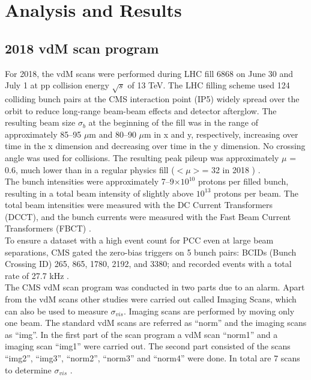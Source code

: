 \chapter{Analysis and Results}


\section{2018 vdM scan program}

For 2018, the vdM scans were performed during LHC fill 6868 on June 30 and July 1 at pp collision energy $\sqrt{s}$ of 13 TeV. The LHC filling scheme used  124 colliding bunch pairs at the CMS interaction point (IP5) widely spread over the orbit to reduce long-range beam-beam effects and detector afterglow.  The resulting beam size $\sigma_{b}$ at the beginning of the fill was in the range of approximately 85–95 $\mu$m and 80–90 $\mu$m in x and y, respectively, increasing over time in the x dimension and decreasing over time in the y dimension. No crossing angle was used for collisions. The resulting peak pileup was approximately $\mu$ = 0.6, much lower than in a regular physics fill ($<\mu>$= 32 in 2018 ) \cite{pas_18}.\\ %
The bunch intensities were approximately 7–9$\times 10^{10}$ protons per filled bunch, resulting in a total beam intensity of slightly above $10^{13}$ protons per beam. The total beam intensities were measured with the DC Current Transformers (DCCT), and the bunch currents were measured with the Fast Beam Current Transformers (FBCT) \cite{pas_18}.\\
To ensure a dataset with a high event count for PCC even at large beam separations, CMS gated the zero-bias triggers on 5 bunch pairs: BCIDs (Bunch Crossing ID) 265, 865, 1780, 2192, and 3380; and recorded events with a total rate of 27.7 kHz \cite{pas_18}.\\
The CMS vdM scan program was conducted in two parts due to an alarm. Apart from the vdM scans other studies were carried out called Imaging Scans, which can also be used to measure $\sigma_{vis}$. Imaging scans are performed by moving only one beam. The standard vdM scans are referred as ``norm'' and the imaging scans as ``img''. In the first part of the scan program a vdM scan ``norm1'' and a imaging scan ``img1'' were carried out. The second part consisted of the scans ``img2'', ``img3'', ``norm2'', ``norm3'' and ``norm4'' were done. In total are 7 scans to determine $\sigma_{vis}$ \cite{pas_18}.\\
